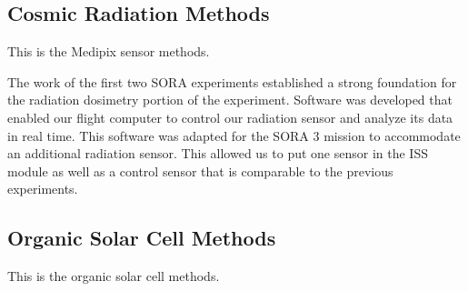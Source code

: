 \subsection{Cosmic Radiation Methods}
\label{sec:Cosmic-Radiation-Methods}

This is the Medipix sensor methods.

The work of the first two SORA experiments \cite{SORA1} \cite{SORA2} established a strong foundation for the radiation dosimetry portion of the experiment.
Software was developed that enabled our flight computer to control our radiation sensor and analyze its data in real time.
This software was adapted for the SORA 3 mission to accommodate an additional radiation sensor.
This allowed us to put one sensor in the ISS module as well as a control sensor that is comparable to the previous experiments.



\subsection{Organic Solar Cell Methods}
\label{sec:Solar-Cell-Methods}

This is the organic solar cell methods.

